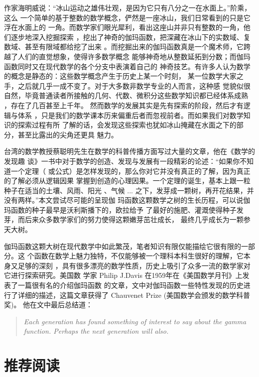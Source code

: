 作家海明威说：“冰山运动之雄伟壮观，是因为它只有八分之一在水面上。”阶乘，这么
一个简单的基于整数的数学概念，俨然是一座冰山，我们日常看到的只是它浮在水面上的
一角。而数学家们眼光犀利，看出这座山并非只有整数的一角，他们逐步地深入挖掘探索
，挖出了神奇的伽玛函数，把深藏在冰山下的实数域、复数域、甚至有限域都给挖了出来
。而挖掘出来的伽玛函数真是一个魔术师，它跨越了人们的直觉想象，使得许多数学概念
能够神奇地从整数延拓到分数；而伽玛函数同时又在现代数学的各个分支中表演着自己的
神奇技艺。有许多人认为数学的概念是静态的：这些数学概念产生于历史上某一个时刻，
某一位数学大家之手，之后就几乎一成不变了。对于大多数非数学专业的人而言，这种感
觉貌似很自然，毕竟普通读者所接触的几何、代数、微积分这些数学知识都已经体系成熟
，存在了几百甚至上千年。 然而数学的发展其实是先有探索的阶段，然后才有逻辑与体系
，只是我们的数学课本历来偏重后者而忽视前者。而如果我们对数学知识的探索过程有所
了解的话，会发现这些探索也犹如冰山掩藏在水面之下的部分，甚至比露出的尖角还更具
魅力。 

台湾的数学教授蔡聪明先生在数学的科普传播方面写过大量的文章，他在《数学的发现趣
谈》一书中对于数学的创造、发现与发展有一段精彩的论述：“如果你不知道一个定理（
或公式）是怎样发现的，那么你对它并没有真正的了解，因为真正的了解必须从逻辑因果
掌握到创造的心理因果。一个定理的诞生，基本上跟一粒种子在适当的土壤、风雨、阳光
、气候 ... 之下，发芽成一颗树，再开花结果，并没有两样。”本文尝试尽可能的呈现伽
玛函数这颗数学之树的生长历程，可以说伽玛函数的种子最早是沃利斯播下的，欧拉给予
了最好的施肥、灌溉使得种子发芽，而后来众多数学家们的努力使得这颗嫩芽茁壮成长，
最终几乎成长为一颗参天大树。

伽玛函数这颗大树在现代数学中如此繁茂，笔者知识有限仅能描绘它很有限的一部分。这
个函数在数学上魅力独特，不仅能够被一个理科本科生很好的理解，它本身又足够的深刻
，具有很多漂亮的数学性质，历史上吸引了众多一流的数学家对它进行探索研究。美国数
学家 Philip J.Davis 在1959年在《美国数学月刊》上发表了一篇很有名的介绍伽玛函数
的文章，文中对伽玛函数一些特性发现的历史进行了详细的描述，这篇文章获得了
Chauvenet Prize (美国数学会颁发的数学科普奖)。 他在文中最后总结道：

\begin{quotation}
\noindent
\emph{Each generation has found something of interest to say about the gamma function.
Perhaps the next generation will also.}
\end{quotation}


\section{推荐阅读}

